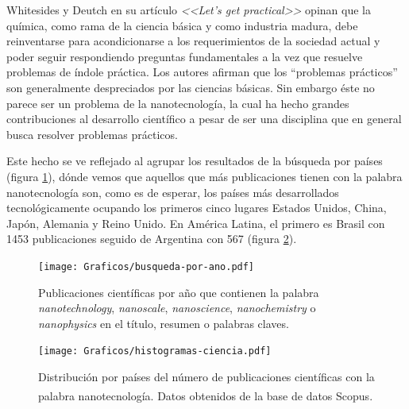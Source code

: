 	 Whitesides y Deutch en su artículo \textit{<<Let's get practical>>}\cite{Burdass2010} opinan que la química, como rama de la ciencia básica y como industria madura, debe reinventarse para acondicionarse a los requerimientos de la sociedad actual y poder seguir respondiendo preguntas fundamentales a la vez que resuelve problemas de índole práctica. Los autores afirman que los ``problemas prácticos'' son generalmente despreciados por las ciencias básicas.  Sin embargo éste no parece ser un problema de la nanotecnología, la cual ha hecho grandes contribuciones al desarrollo científico a pesar de ser una disciplina que en general busca resolver problemas prácticos.
			

	 \pagebreak Este hecho se ve reflejado al agrupar los resultados de la búsqueda por países (figura \ref{fig:publicaciones-ano}), dónde vemos que aquellos que más publicaciones tienen con la palabra nanotecnología son, como es de esperar, los países más desarrollados tecnológicamente ocupando los primeros cinco lugares Estados Unidos, China, Japón, Alemania y Reino Unido. En América Latina, el primero es Brasil con 1453 publicaciones seguido de Argentina con 567 (figura \ref{fig:paises}).


 			\begin{figure}[h!]
 			\begin{center}
 			\hspace{0.3cm}\texttt{[image: Graficos/busqueda-por-ano.pdf]}
 			\vspace*{-0.6cm}
 			\caption[Publicaciones por año en nanotecnología]{Publicaciones científicas por año que contienen la palabra \textit{nanotechnology}, \textit{nanoscale}, \textit{nanoscience}, \textit{nanochemistry} o \textit{nanophysics} en el título, resumen o palabras claves.}
 			\label{fig:publicaciones-ano}
 			\vspace*{-0.2cm} 		    
 			\end{center}
 		    \end{figure}

			\begin{figure}[b!]
 				\begin{center}
 				\texttt{[image: Graficos/histogramas-ciencia.pdf]}
 				\vspace*{-0.4cm}
 				\caption[Nanotecnología por países]{Distribución por países del número de publicaciones científicas con la palabra nanotecnología. Datos obtenidos de la base de datos Scopus\textsuperscript\textregistered.}
 				\label{fig:paises}
 		    	\end{center}
 		    	\end{figure}

